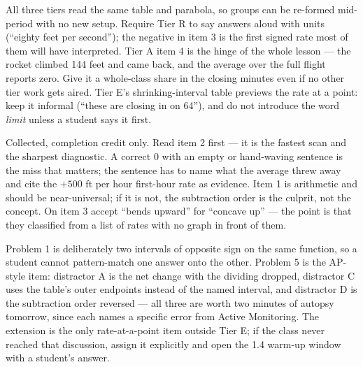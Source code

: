 \documentclass[10pt]{article}
\begin{document}
\begin{teachernote}
All three tiers read the same table and parabola, so groups can be re-formed
mid-period with no new setup. Require Tier R to say answers aloud with units
(``eighty feet per second''); the negative in item 3 is the first signed rate
most of them will have interpreted. Tier A item 4 is the hinge of the whole
lesson --- the rocket climbed 144 feet and came back, and the average over the
full flight reports zero. Give it a whole-class share in the closing minutes
even if no other tier work gets aired. Tier E's shrinking-interval table
previews the rate at a point: keep it informal (``these are closing in on
64''), and do not introduce the word \textit{limit} unless a student says it
first.
\end{teachernote}

\begin{teachernote}
Collected, completion credit only. Read item 2 first --- it is the fastest
scan and the sharpest diagnostic. A correct $0$ with an empty or hand-waving
sentence is the miss that matters; the sentence has to name what the average
threw away and cite the $+500$ ft per hour first-hour rate as evidence. Item 1
is arithmetic and should be near-universal; if it is not, the subtraction
order is the culprit, not the concept. On item 3 accept ``bends upward'' for
``concave up'' --- the point is that they classified from a list of rates with
no graph in front of them.
\end{teachernote}

\begin{teachernote}[Homework]
Problem 1 is deliberately two intervals of opposite sign on the same function,
so a student cannot pattern-match one answer onto the other. Problem 5 is the
AP-style item: distractor A is the net change with the dividing dropped,
distractor C uses the table's outer endpoints instead of the named interval,
and distractor D is the subtraction order reversed --- all three are worth two
minutes of autopsy tomorrow, since each names a specific error from Active
Monitoring. The extension is the only rate-at-a-point item outside Tier E; if
the class never reached that discussion, assign it explicitly and open the 1.4
warm-up window with a student's answer.
\end{teachernote}
\end{document}
